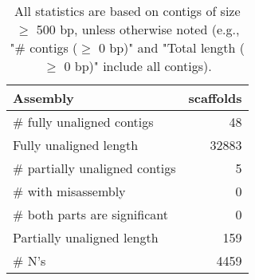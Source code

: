 \documentclass[12pt,a4paper]{article}
\begin{document}
\begin{table}[ht]
\begin{center}
\caption{All statistics are based on contigs of size $\geq$ 500 bp, unless otherwise noted (e.g., "\# contigs ($\geq$ 0 bp)" and "Total length ($\geq$ 0 bp)" include all contigs).}
\begin{tabular}{|l*{1}{|r}|}
\hline
Assembly & scaffolds \\ \hline
\# fully unaligned contigs & 48 \\ \hline
Fully unaligned length & 32883 \\ \hline
\# partially unaligned contigs & 5 \\ \hline
\hspace{5mm}\# with misassembly & 0 \\ \hline
\hspace{5mm}\# both parts are significant & 0 \\ \hline
Partially unaligned length & 159 \\ \hline
\# N's & 4459 \\ \hline
\end{tabular}
\end{center}
\end{table}
\end{document}
